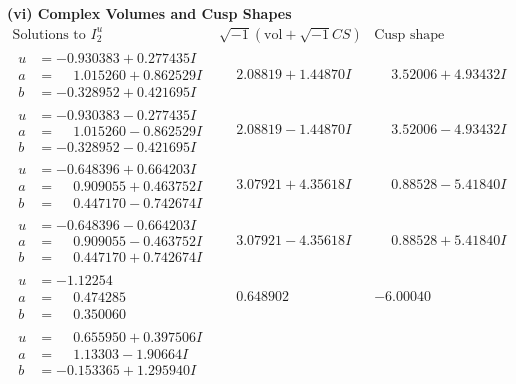 \documentclass[1p]{elsarticle_modified}
\theoremstyle{definition}
\newcommand{\I}{\sqrt{-1}}
\begin{document}
\newpage\flushleft \textbf{(vi) Complex Volumes and Cusp Shapes}
$$\begin{array}{c|c|c}  
\text{Solutions to }I^u_{2}& \I (\text{vol} + \sqrt{-1}CS) & \text{Cusp shape}\\
 \hline 
\begin{aligned}
u &= -0.930383 + 0.277435 I \\
a &= \phantom{-}1.015260 + 0.862529 I \\
b &= -0.328952 + 0.421695 I\end{aligned}
 & \phantom{-}2.08819 + 1.44870 I & \phantom{-}3.52006 + 4.93432 I \\ \hline\begin{aligned}
u &= -0.930383 - 0.277435 I \\
a &= \phantom{-}1.015260 - 0.862529 I \\
b &= -0.328952 - 0.421695 I\end{aligned}
 & \phantom{-}2.08819 - 1.44870 I & \phantom{-}3.52006 - 4.93432 I \\ \hline\begin{aligned}
u &= -0.648396 + 0.664203 I \\
a &= \phantom{-}0.909055 + 0.463752 I \\
b &= \phantom{-}0.447170 - 0.742674 I\end{aligned}
 & \phantom{-}3.07921 + 4.35618 I & \phantom{-}0.88528 - 5.41840 I \\ \hline\begin{aligned}
u &= -0.648396 - 0.664203 I \\
a &= \phantom{-}0.909055 - 0.463752 I \\
b &= \phantom{-}0.447170 + 0.742674 I\end{aligned}
 & \phantom{-}3.07921 - 4.35618 I & \phantom{-}0.88528 + 5.41840 I \\ \hline\begin{aligned}
u &= -1.12254\phantom{ +0.000000I} \\
a &= \phantom{-}0.474285\phantom{ +0.000000I} \\
b &= \phantom{-}0.350060\phantom{ +0.000000I}\end{aligned}
 & \phantom{-}0.648902\phantom{ +0.000000I} & -6.00040\phantom{ +0.000000I} \\ \hline\begin{aligned}
u &= \phantom{-}0.655950 + 0.397506 I \\
a &= \phantom{-}1.13303 - 1.90664 I \\
b &= -0.153365 + 1.295940 I\end{aligned}

\end{array}$$
\end{document}
